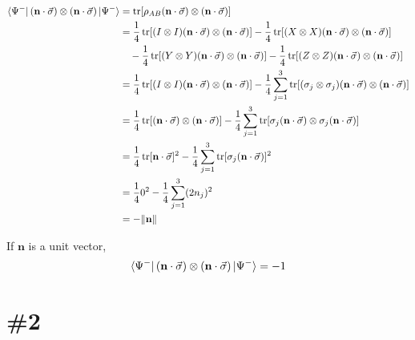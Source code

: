 \documentclass[a4paper,11pt]{article}
\begin{document}
\begin{align}
    \bra{\Psi^-}(\mathbf n\cdot\vec \sigma)\otimes (\mathbf n\cdot\vec \sigma)\ket{\Psi^-}
    &= \operatorname{tr}[\rho_{AB}(\mathbf n\cdot\vec \sigma)\otimes (\mathbf n\cdot\vec \sigma)] \\
    &= \frac{1}{4}\operatorname{tr}[(I\otimes I)(\mathbf n\cdot\vec \sigma)\otimes (\mathbf n\cdot\vec \sigma)] -\frac{1}{4}\operatorname{tr}[(X\otimes X)(\mathbf n\cdot\vec \sigma)\otimes (\mathbf n\cdot\vec \sigma)] \\
    &\quad -\frac{1}{4}\operatorname{tr}[(Y\otimes Y)(\mathbf n\cdot\vec \sigma)\otimes (\mathbf n\cdot\vec \sigma)]-\frac{1}{4}\operatorname{tr}[(Z\otimes Z)(\mathbf n\cdot\vec \sigma)\otimes (\mathbf n\cdot\vec \sigma)]\\
    &=\frac{1}{4}\operatorname{tr}[(I\otimes I)(\mathbf n\cdot\vec \sigma)\otimes (\mathbf n\cdot\vec \sigma)]-\frac{1}{4}\sum_{j=1}^3\operatorname{tr}[(\sigma_j\otimes\sigma_j)(\mathbf n\cdot\vec \sigma)\otimes (\mathbf n\cdot\vec \sigma)]\\
    &=\frac{1}{4}\operatorname{tr}[(\mathbf n\cdot\vec \sigma)\otimes (\mathbf n\cdot\vec \sigma)]-\frac{1}{4}\sum_{j=1}^3\operatorname{tr}[\sigma_j(\mathbf n\cdot\vec \sigma)\otimes \sigma_j(\mathbf n\cdot\vec \sigma)]\\
    &=\frac{1}{4}\operatorname{tr}[\mathbf n\cdot\vec \sigma]^2-\frac{1}{4}\sum_{j=1}^3\operatorname{tr}[\sigma_j(\mathbf n\cdot\vec \sigma)]^2\\
    &=\frac{1}{4} 0^2-\frac{1}{4}\sum_{j=1}^3(2 n_j)^2\\
    &=-\|\mathbf n\|
\end{align}

If $\mathbf n$ is a unit vector,
\begin{equation}
    \bra{\Psi^-}(\mathbf n\cdot\vec \sigma)\otimes (\mathbf n\cdot\vec \sigma)\ket{\Psi^-}=-1
\end{equation}

\section{\#2}
\end{document}
